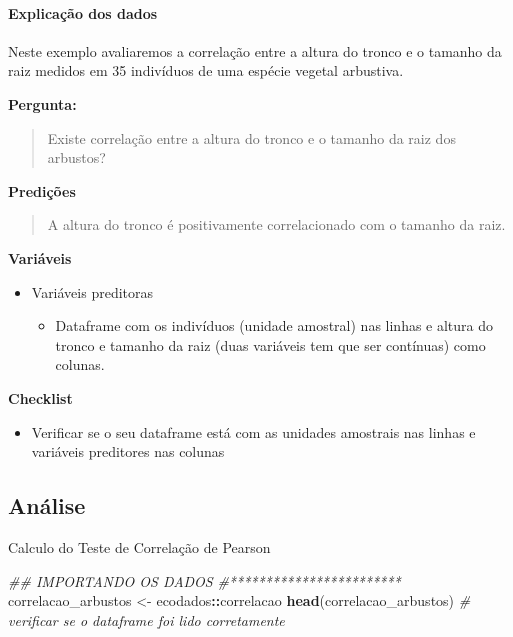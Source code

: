 \documentclass[
]{book}
\newenvironment{Shaded}{\begin{snugshade}}{\end{snugshade}}
\newcommand{\CommentTok}[1]{\textcolor[rgb]{0.56,0.35,0.01}{\textit{#1}}}
\newcommand{\KeywordTok}[1]{\textcolor[rgb]{0.13,0.29,0.53}{\textbf{#1}}}
\newcommand{\NormalTok}[1]{#1}
\newcommand{\OperatorTok}[1]{\textcolor[rgb]{0.81,0.36,0.00}{\textbf{#1}}}
\newcommand{\StringTok}[1]{\textcolor[rgb]{0.31,0.60,0.02}{#1}}
\providecommand{\tightlist}{%
  \setlength{\itemsep}{0pt}\setlength{\parskip}{0pt}}
\begin{document}
\hypertarget{explicauxe7uxe3o-dos-dados-3}{%
\paragraph{Explicação dos dados}\label{explicauxe7uxe3o-dos-dados-3}}

Neste exemplo avaliaremos a correlação entre a altura do tronco e o tamanho da raiz medidos em 35 indivíduos de uma espécie vegetal arbustiva.

\textbf{Pergunta:}

\begin{quote}
Existe correlação entre a altura do tronco e o tamanho da raiz dos arbustos?
\end{quote}

\textbf{Predições}

\begin{quote}
A altura do tronco é positivamente correlacionado com o tamanho da raiz.
\end{quote}

\textbf{Variáveis}

\begin{itemize}
\tightlist
\item
  Variáveis preditoras

  \begin{itemize}
  \tightlist
  \item
    Dataframe com os indivíduos (unidade amostral) nas linhas e altura do tronco e tamanho da raiz (duas variáveis tem que ser contínuas) como colunas.
  \end{itemize}
\end{itemize}

\textbf{Checklist}

\begin{itemize}
\tightlist
\item
  Verificar se o seu dataframe está com as unidades amostrais nas linhas e variáveis preditores nas colunas
\end{itemize}

\hypertarget{anuxe1lise-3}{%
\subsection{Análise}\label{anuxe1lise-3}}

Calculo do Teste de Correlação de Pearson

\begin{Shaded}
\begin{Highlighting}[]
\CommentTok{## IMPORTANDO OS DADOS}
\CommentTok{#************************}
\NormalTok{correlacao_arbustos <-}\StringTok{ }\NormalTok{ecodados}\OperatorTok{::}\NormalTok{correlacao}
\KeywordTok{head}\NormalTok{(correlacao_arbustos) }\CommentTok{# verificar se o dataframe foi lido corretamente}
\end{Highlighting}
\end{Shaded}
\end{document}
